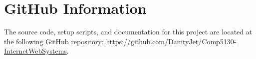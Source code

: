 \section{GitHub Information}

The source code, setup scripts, and documentation for this project are located at the following GitHub repository: \href{https://github.com/DaintyJet/Comp5130-InternetWebSystems}{https://github.com/DaintyJet/Comp5130-InternetWebSystems}.